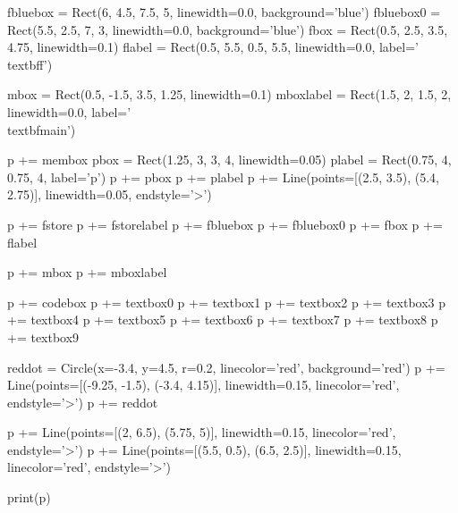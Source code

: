 \begin{python}
fbluebox = Rect(6, 4.5, 7.5, 5, linewidth=0.0, background='blue')
fbluebox0 = Rect(5.5, 2.5, 7, 3, linewidth=0.0, background='blue')
fbox = Rect(0.5, 2.5, 3.5, 4.75, linewidth=0.1)
flabel = Rect(0.5, 5.5, 0.5, 5.5, linewidth=0.0, label='\\textbf{f}')

mbox = Rect(0.5, -1.5, 3.5, 1.25, linewidth=0.1)
mboxlabel = Rect(1.5, 2, 1.5, 2, linewidth=0.0, label='\\textbf{main}')

p += membox
pbox = Rect(1.25, 3, 3, 4, linewidth=0.05)
plabel = Rect(0.75, 4, 0.75, 4, label='p')
p += pbox
p += plabel
p += Line(points=[(2.5, 3.5), (5.4, 2.75)], linewidth=0.05, endstyle='>')

p += fstore
p += fstorelabel
p += fbluebox
p += fbluebox0
p += fbox
p += flabel

p += mbox
p += mboxlabel

p += codebox
p += textbox0
p += textbox1
p += textbox2
p += textbox3
p += textbox4
p += textbox5
p += textbox6
p += textbox7
p += textbox8
p += textbox9

reddot = Circle(x=-3.4, y=4.5, r=0.2, linecolor='red', background='red')
p += Line(points=[(-9.25, -1.5), (-3.4, 4.15)], linewidth=0.15, linecolor='red', endstyle='>')
p += reddot

p += Line(points=[(2, 6.5), (5.75, 5)], linewidth=0.15, linecolor='red', endstyle='>')
p += Line(points=[(5.5, 0.5), (6.5, 2.5)], linewidth=0.15, linecolor='red', endstyle='>')

print(p)
\end{python}

